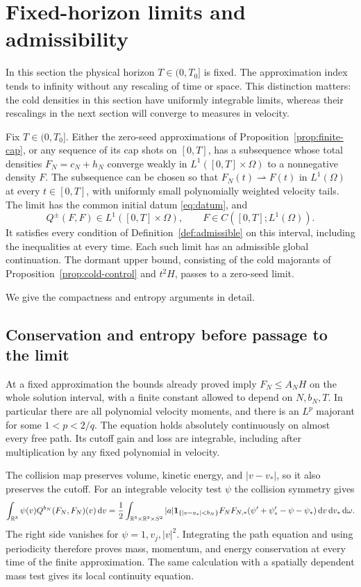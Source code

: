 \section{Fixed-horizon limits and admissibility}\label{sec:admissibility}

In this section the physical horizon \(T\in(0,T_0]\) is fixed. The
approximation index tends to infinity without any rescaling of time or
space. This distinction matters: the cold densities in this section have
uniformly integrable limits, whereas their rescalings in the next section
will converge to measures in velocity.

\begin{proposition}\label{prop:admissible-limits}
Fix \(T\in(0,T_0]\). Either the zero-seed approximations of
Proposition~\ref{prop:finite-cap}, or any sequence of its cap shots on
\([0,T]\), has a subsequence whose total densities \(F_N=c_N+h_N\)
converge weakly in \(L^1([0,T]\times\Omega)\) to a nonnegative density
\(F\). The subsequence can be chosen so that
\(F_N(t)\rightharpoonup F(t)\) in \(L^1(\Omega)\) at every
\(t\in[0,T]\), with uniformly small polynomially weighted velocity
tails. The limit has the common initial datum \eqref{eq:datum}, and
\[
Q^\pm(F,F)\in L^1([0,T]\times\Omega),\qquad
F\in C([0,T];L^1(\Omega)).
\]
It satisfies every condition of Definition~\ref{def:admissible} on this
interval, including the inequalities at every time. Each such limit has
an admissible global continuation. The dormant upper bound, consisting
of the cold majorants of Proposition~\ref{prop:cold-control} and
\(t^2H\), passes to a zero-seed limit.
\end{proposition}

We give the compactness and entropy arguments in detail.

\subsection{Conservation and entropy before passage to the limit}

At a fixed approximation the bounds already proved imply
\(F_N\leq A_N H\) on the whole solution interval, with a finite constant
allowed to depend on \(N,b_N,T\). In particular there are all polynomial
velocity moments, and there is an \(L^p\) majorant for some
\(1<p<2/q\). The equation holds absolutely continuously on almost every
free path. Its cutoff gain and loss are integrable, including after
multiplication by any fixed polynomial in velocity.

The collision map preserves volume, kinetic energy, and
\(|v-v_*|\), so it also preserves the cutoff. For an integrable velocity
test \(\psi\) the collision symmetry gives
\[
\int_{\mathbb R^3}\psi(v)Q^{b_N}(F_N,F_N)(v)\,\mathrm d v
=\frac12\int_{\mathbb R^3\times\mathbb R^3\times S^2}
 |a|\mathbf 1_{\{|v-v_*|<b_N\}}F_NF_{N,*}
 (\psi'+\psi_*'-\psi-\psi_*)\,\mathrm d v\,\mathrm d v_*\,\mathrm d\omega.
\]
The right side vanishes for \(\psi=1,v_j,|v|^2\).
Integrating the path equation and using periodicity therefore proves
mass, momentum, and energy conservation at every time of the finite
approximation. The same calculation with a spatially dependent mass test
gives its local continuity equation.

